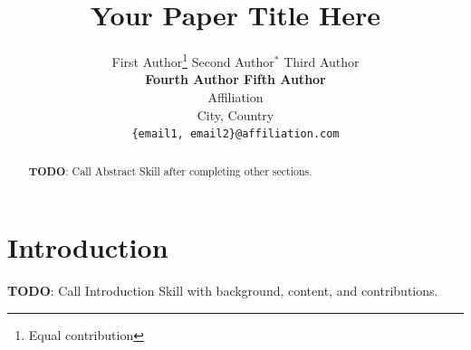 \documentclass{article}
\title{Your Paper Title Here}
\author{%
  First Author\thanks{Equal contribution} \quad
  Second Author$^*$ \quad
  Third Author \\[2pt]
  \textbf{Fourth Author \quad Fifth Author} \\[2pt]
  Affiliation \\[2pt]
  City, Country \\[2pt]
  \texttt{\{email1, email2\}@affiliation.com}
}
\begin{document}
\maketitle

\begin{abstract}
%
%

\textbf{TODO}: Call Abstract Skill after completing other sections.


\end{abstract}

\section{Introduction}
\label{sec:intro}


\textbf{TODO}: Call Introduction Skill with background, content, and contributions.

\end{document}
